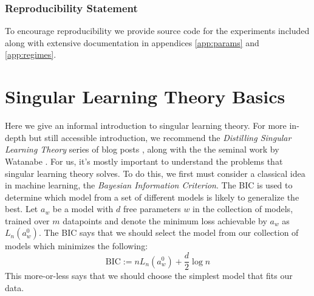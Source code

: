 \documentclass{article} %
\theoremstyle{definition}
\begin{document}



\subsubsection{Reproducibility Statement}
To encourage reproducibility we provide source code for the experiments included along with extensive documentation in appendices \ref{app:params} and \ref{app:regimes}.






\appendix
\section{Singular Learning Theory Basics}\label{app:slt}
Here we give an informal introduction to singular learning theory. For more in-depth but still accessible introduction, we recommend the \textit{Distilling Singular Learning Theory} series of blog posts \citep{carroll2023distilling}, along with the the seminal work by Watanabe \citep{Watanabe2009AlgebraicGA}. For us, it's mostly important to understand the problems that singular learning theory solves. To do this, we first must consider a classical idea in machine learning, the \textit{Bayesian Information Criterion}. The BIC is used to determine which model from a set of different models is likely to generalize the best. Let $a_w$ be a model with $d$ free parameters $w$ in the collection of models, trained over $m$ datapoints and denote the minimum loss achievable by $a_w$ as $L_n(a_w^0)$. The BIC says that we should select the model from our collection of models which minimizes the following:
\begin{equation}
    \text{BIC} := nL_n(a_w^0) + \frac{d}{2} \log n
\end{equation}
This more-or-less says that we should choose the simplest model that fits our data.
\end{document}
